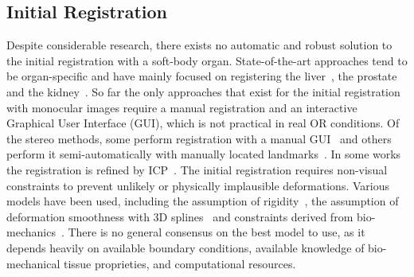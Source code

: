 \subsection{Initial Registration}

Despite considerable research, there exists no automatic and robust solution to the initial registration with a soft-body organ. State-of-the-art approaches tend to be organ-specific and have mainly focused on registering the liver~\cite{haouchine13,haouchine:hal-01186011,plantefeve:hal-01205194}, the prostate~\cite{Cohen2010Prostate} and the kidney~\cite{Su2009,nosrati2014simultaneous,affineTracking}.
So far the only approaches that exist for the initial registration with monocular images require a manual registration \cite{affineTracking} and an interactive Graphical User Interface (GUI), which is not practical in real OR conditions. 
Of the stereo methods, some perform registration with a manual GUI~\cite{Cohen2010Prostate,haouchine13} and others perform it semi-automatically with manually located landmarks~\cite{21142942,conf/miccai/Amir-KhaliliNPHA13,hamarneh2014igrs,Su2009}. In some works the registration is refined by ICP~\cite{hamarneh2014igrs,Su2009}.%
The initial registration requires non-visual constraints to prevent unlikely or physically implausible deformations. Various models have been used, including the assumption of rigidity~\cite{Su2009}, the assumption of deformation smoothness with 3D splines~\cite{conf/miccai/Amir-KhaliliNPHA13} and constraints derived from bio-mechanics~\cite{hamarneh2014igrs,haouchine13}. 
There is no general consensus on the best model to use, as it depends heavily on available boundary conditions, available knowledge of bio-mechanical tissue proprieties, and computational resources. 

